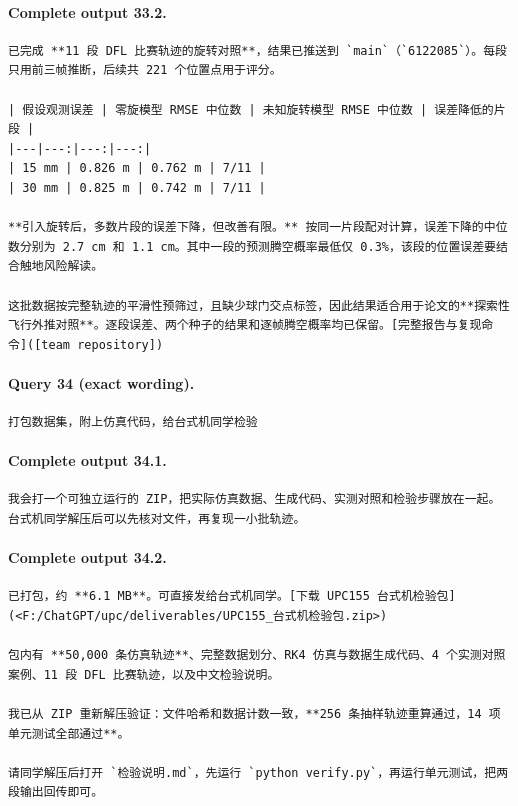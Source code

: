 \documentclass[UTF8,10pt]{ctexart}
\begin{document}
\paragraph{Complete output 33.2.}
\begin{Verbatim}[breaklines=true,breakanywhere=true,fontsize=\scriptsize,frame=single,framesep=2pt]
已完成 **11 段 DFL 比赛轨迹的旋转对照**，结果已推送到 `main`（`6122085`）。每段只用前三帧推断，后续共 221 个位置点用于评分。

| 假设观测误差 | 零旋模型 RMSE 中位数 | 未知旋转模型 RMSE 中位数 | 误差降低的片段 |
|---|---:|---:|---:|
| 15 mm | 0.826 m | 0.762 m | 7/11 |
| 30 mm | 0.825 m | 0.742 m | 7/11 |

**引入旋转后，多数片段的误差下降，但改善有限。** 按同一片段配对计算，误差下降的中位数分别为 2.7 cm 和 1.1 cm。其中一段的预测腾空概率最低仅 0.3%，该段的位置误差要结合触地风险解读。

这批数据按完整轨迹的平滑性预筛过，且缺少球门交点标签，因此结果适合用于论文的**探索性飞行外推对照**。逐段误差、两个种子的结果和逐帧腾空概率均已保留。[完整报告与复现命令]([team repository])
\end{Verbatim}

\paragraph{Query 34 (exact wording).}
\begin{Verbatim}[breaklines=true,breakanywhere=true,fontsize=\scriptsize,frame=single,framesep=2pt]
打包数据集，附上仿真代码，给台式机同学检验
\end{Verbatim}

\paragraph{Complete output 34.1.}
\begin{Verbatim}[breaklines=true,breakanywhere=true,fontsize=\scriptsize,frame=single,framesep=2pt]
我会打一个可独立运行的 ZIP，把实际仿真数据、生成代码、实测对照和检验步骤放在一起。台式机同学解压后可以先核对文件，再复现一小批轨迹。
\end{Verbatim}

\paragraph{Complete output 34.2.}
\begin{Verbatim}[breaklines=true,breakanywhere=true,fontsize=\scriptsize,frame=single,framesep=2pt]
已打包，约 **6.1 MB**。可直接发给台式机同学。[下载 UPC155 台式机检验包](<F:/ChatGPT/upc/deliverables/UPC155_台式机检验包.zip>)

包内有 **50,000 条仿真轨迹**、完整数据划分、RK4 仿真与数据生成代码、4 个实测对照案例、11 段 DFL 比赛轨迹，以及中文检验说明。

我已从 ZIP 重新解压验证：文件哈希和数据计数一致，**256 条抽样轨迹重算通过，14 项单元测试全部通过**。

请同学解压后打开 `检验说明.md`，先运行 `python verify.py`，再运行单元测试，把两段输出回传即可。
\end{Verbatim}
\end{document}
